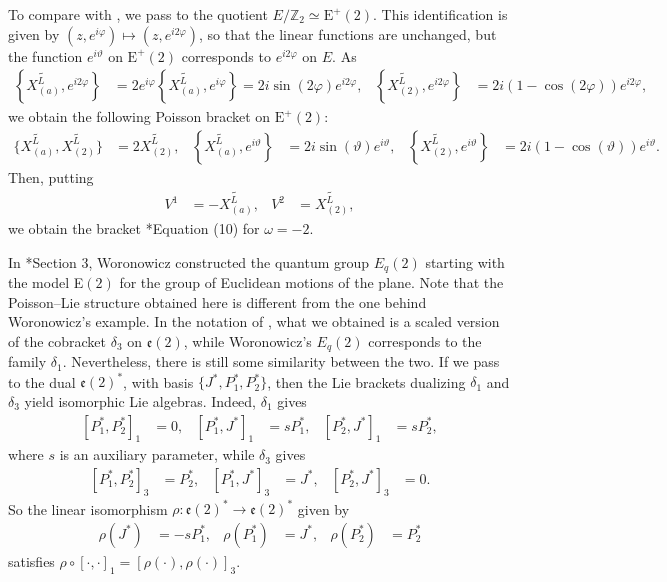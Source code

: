 \documentclass[a4paper,11pt]{amsart}
\newcommand{\bb}[1]{\mathbb{#1}}
\newcommand{\fr}[1]{\mathfrak{#1}}
\newcommand{\vph}{\varphi}
\newcommand{\vth}{\vartheta}
\newcommand{\rE}{\mathrm{E}}
\theoremstyle{definition}
\theoremstyle{remark}
\begin{document}
To compare with \cite{MR1267935}, we pass to the quotient $E/\bb{Z}_2 \simeq \rE^+(2)$.
This identification is given by $(z,e^{i\vph}) \mapsto (z,e^{i2\vph})$, so that the linear functions are unchanged, but the function $e^{i\vth}$ on $\rE^+(2)$ corresponds to $e^{i2\vph}$ on $E$.
As
\begin{align*}
\left\{ \widetilde{X^L_{(a)}} , e^{i2\vph} \right\} &= 2 e^{i\vph} \mathopen{} \left\{ \widetilde{X^L_{(a)}} , e^{i\vph} \right\} = 2 i \sin(2\vph) e^{i2\vph} ,&
\left\{ \widetilde{X^L_{(2)}} , e^{i2\vph} \right\} &= 2 i \left( 1 -\cos(2\vph) \right) e^{i2\vph} ,
\end{align*}
we obtain the following Poisson bracket on $\rE^+(2)$:
\begin{align*}
\{ \widetilde{X^L_{(a)}}, \widetilde{X^L_{(2)}} \} &= 2 \widetilde{X^L_{(2)}} , &
\left\{ \widetilde{X^L_{(a)}} , e^{i\vth} \right\} &= 2 i \sin(\vth) e^{i\vth} ,&
\left\{ \widetilde{X^L_{(2)}} , e^{i\vth} \right\} &= 2 i \left( 1 - \cos(\vth) \right) e^{i\vth} .
\end{align*}
Then, putting
\begin{align*}
V^1 &= -\widetilde{X^L_{(a)}},&
V^2 &=\widetilde{X^L_{(2)}},
\end{align*}
we obtain the bracket \cite{MR1267935}*{Equation (10)} for $\omega = -2$.

In \cite{MR1096123}*{Section 3}, Woronowicz constructed the quantum group $E_q(2)$ starting with the model E$(2)$ for the group of Euclidean motions of the plane.
Note that the Poisson--Lie structure obtained here is different from the one behind Woronowicz's example.
In the notation of \cite{MR1399267}, what we obtained is a scaled version of the cobracket $\delta_3$ on $\fr{e}(2)$, while Woronowicz's $E_q(2)$ corresponds to the family $\delta_1$.
Nevertheless, there is still some similarity between the two.
If we pass to the dual $\fr{e}(2)^*$, with basis $\{J^*,P_1^*,P_2^*\}$, then the Lie brackets dualizing $\delta_1$ and $\delta_3$ yield isomorphic Lie algebras.
Indeed, $\delta_1$ gives
\begin{align}
\label{eq:dual-bracket-for-delta-1}
\left[ P_1^* , P_2^* \right]_1 &= 0 ,&
\left[ P_1^* , J^* \right]_1 &= s P_1^* ,&
\left[ P_2^* , J^* \right]_1 &= s P_2^*,
\end{align}
where $s$ is an auxiliary parameter, while $\delta_3$ gives
\begin{align*}
\left[ P_1^* , P_2^* \right]_3 &= P_2^* ,&
\left[ P_1^* , J^* \right]_3 &= J^* ,&
 \left[ P_2^* , J^* \right]_3 &= 0 .
\end{align*}
So the linear isomorphism $\rho\colon \fr{e}(2)^* \rightarrow \fr{e}(2)^*$ given by
\begin{align*}
\rho(J^*) &= - s P_1^*,&
\rho(P_1^*) &= J^*,&
\rho(P_2^*) &= P_2^*
\end{align*}
satisfies $\rho \circ [\cdot,\cdot]_1 = [\rho(\cdot),\rho(\cdot)]_3$.
\end{document}
